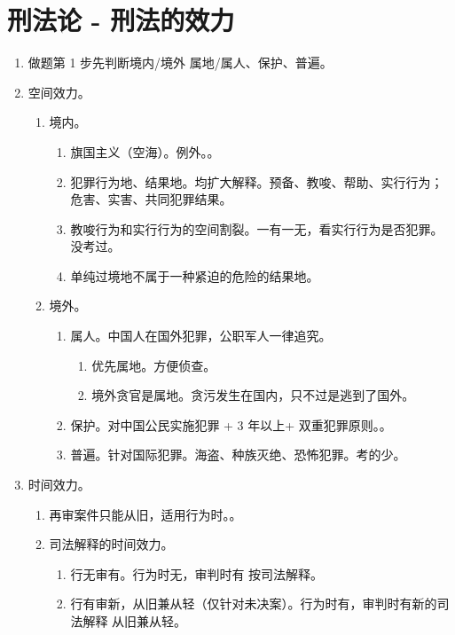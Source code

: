 \section{刑法论 - 刑法的效力}
\begin{enumerate}
  \item 做题第 1 步先判断境内/境外 \yjt 属地/属人、保护、普遍。
  \item 空间效力。
        \begin{enumerate}
          \item 境内。
                \begin{enumerate}
                  \item 旗国主义（空海）。例外。。
                  \item 犯罪行为地、结果地。均扩大解释。预备、教唆、帮助、实行行为；危害、实害、共同犯罪结果。
                  \item 教唆行为和实行行为的空间割裂。一有一无，看实行行为是否犯罪。没考过。
                  \item 单纯过境地不属于一种紧迫的危险的结果地。
                \end{enumerate}
          \item 境外。
                \begin{enumerate}
                  \item 属人。中国人在国外犯罪，公职军人一律追究。
                        \begin{enumerate}
                          \item 优先属地。方便侦查。
                          \item 境外贪官是属地。贪污发生在国内，只不过是逃到了国外。
                        \end{enumerate}
                  \item 保护。对中国公民实施犯罪 + 3 年以上+ 双重犯罪原则。。
                  \item 普遍。针对国际犯罪。海盗、种族灭绝、恐怖犯罪。考的少。
                \end{enumerate}
        \end{enumerate}
  \item 时间效力。
        \begin{enumerate}
          \item 再审案件只能从旧，适用行为时。。
          \item 司法解释的时间效力。
                \begin{enumerate}
                  \item 行无审有。行为时无，审判时有 \yjt 按司法解释。
                  \item 行有审新，从旧兼从轻（仅针对未决案）。行为时有，审判时有新的司法解释 \yjt 从旧兼从轻。
                \end{enumerate}
        \end{enumerate}
\end{enumerate}
